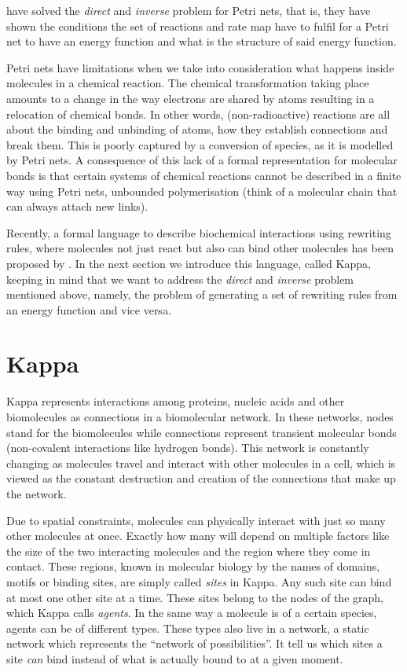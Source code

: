 \citet{et2} have solved
the \emph{direct} and \emph{inverse} problem for Petri nets,
that is, they have shown the conditions
the set of reactions and rate map have to fulfil
for a Petri net to have an energy function
and what is the structure of said energy function.

Petri nets have limitations when we take into consideration
what happens inside molecules in a chemical reaction.
The chemical transformation taking place amounts to
a change in the way electrons are shared by atoms
resulting in a relocation of chemical bonds.
In other words, (non-radioactive) reactions are all about
the binding and unbinding of atoms,
how they establish connections and break them.
This is poorly captured by a conversion of species,
as it is modelled by Petri nets.
A consequence of this lack of a formal representation for
molecular bonds is that certain systems of chemical reactions
cannot be described in a finite way using Petri nets,
\eg unbounded polymerisation
(think of a molecular chain that can always attach new links).

Recently,
a formal language to describe biochemical interactions
using rewriting rules,
where molecules not just react but also can bind other molecules
has been proposed by \citet{kappa}.
In the next section we introduce this language, called Kappa,
keeping in mind that we want to address
the \emph{direct} and \emph{inverse} problem mentioned above,
namely, the problem of generating a set of rewriting rules
from an energy function and vice versa.


\section{Kappa}
\label{sec:kappa}

Kappa represents interactions among proteins,
nucleic acids and other biomolecules as
connections in a biomolecular network.
In these networks, nodes stand for the biomolecules
while connections represent transient molecular bonds
(\eg non-covalent interactions like hydrogen bonds).
This network is constantly changing as molecules
travel and interact with other molecules in a cell,
which is viewed as the constant destruction and creation
of the connections that make up the network.

Due to spatial constraints,
molecules can physically interact with
just so many other molecules at once.
Exactly how many will depend on multiple factors like
the size of the two interacting molecules and
the region where they come in contact.
These regions, known in molecular biology by the names of domains,
motifs or binding sites, are simply called \emph{sites} in Kappa.
Any such site can bind at most one other site at a time.
These sites belong to the nodes of the graph,
which Kappa calls \emph{agents}.
In the same way a molecule is of a certain species,
agents can be of different types.
These types also live in a network,
a static network which represents the ``network of possibilities''.
It tell us which sites a site \emph{can} bind
instead of what is actually bound to at a given moment.

